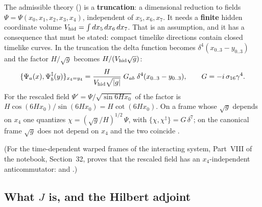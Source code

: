The admissible theory () is a \textbf{truncation}: a dimensional reduction to fields
$\Psi=\Psi(x_0,x_1,x_2,x_3,x_4)$, independent of $x_5,x_6,x_7$. It needs a \textbf{finite} hidden
coordinate volume $V_{\mathrm{hid}}=\int dx_5\,dx_6\,dx_7$. That is an assumption, and it has a consequence that
must be stated: compact timelike directions contain closed timelike curves. In the truncation the
delta function becomes $\delta^4(x_{0..3}-y_{0..3})$ and the factor $H/\sqrt g$ becomes
$H/(V_{\mathrm{hid}}\sqrt g)$:
\[
  \{\Psi_a(x),\Psi^{\ddagger}_b(y)\}_{x_4=y_4}=\frac{H}{V_{\mathrm{hid}}\sqrt{|g|}}\;G_{ab}\;\delta^4(x_{0..3}-y_{0..3}),
  \qquad G=-i\,\sigma_{16}\gamma^4 .
\]
For the rescaled field $\Psi'=\Psi/\sqrt{\sin 6Hx_0}$ of  the factor is
$H\cos(6Hx_0)/\sin(6Hx_0)=H\cot(6Hx_0)$. On a frame whose $\sqrt g$ depends on $x_4$ one quantizes
$\chi=(\sqrt g/H)^{1/2}\,\Psi$, with $\{\chi,\chi^{\ddagger}\}=G\,\delta^7$; on the canonical frame
$\sqrt g$ does not depend on $x_4$ and the two coincide . 

(For the time-dependent warped frames of the interacting system, Part~VIII of the notebook,
Section~32, proves that the rescaled field has an $x_4$-independent anticommutator:
 and .)

\subsection{What \texorpdfstring{$J$}{J} is, and the Hilbert adjoint}
\label{sec:6.5}

